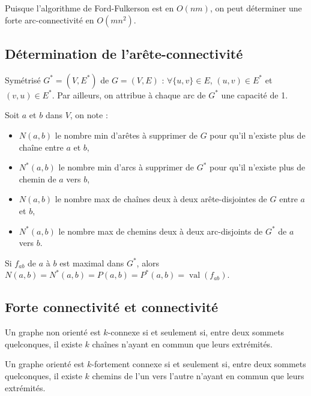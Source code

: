 \documentclass[a4paper,10pt,twocolumn]{article}
\DeclareMathOperator{\val}{val}
\begin{document}
		Puisque l'algorithme de Ford-Fulkerson est en $O(nm)$, on peut déterminer une forte arc-connectivité en $O(mn^2)$.

	\subsection{Détermination de l'arête-connectivité}

		\begin{note}
		Symétrisé $G^* = (V,E^*)$ de $G = (V,E)$ : $\forall \{ u,v \} \in E$, $(u,v) \in E^*$ et $(v,u) \in E^*$.
		Par ailleurs, on attribue à chaque arc de $G^*$ une capacité de 1.
		\end{note}

		\begin{note}
		Soit $a$ et $b$ dans $V$, on note :
			\begin{itemize}
			\item $N(a,b)$ le nombre min d’arêtes à supprimer de $G$ pour qu’il n’existe plus de chaîne entre $a$ et $b$,
			\item $N^*(a,b)$ le nombre min d’arcs à supprimer de $G^*$ pour qu’il n’existe plus de chemin de $a$ vers $b$,
			\item $N(a,b)$ le nombre max de chaînes deux à deux arête-disjointes de $G$ entre $a$ et $b$,
			\item $N^*(a,b)$ le nombre max de chemins deux à deux arc-disjoints de $G^*$ de $a$ vers $b$.
			\end{itemize}
		\end{note}

		\begin{thm}
		Si $f_{ab}$ de $a$ à $b$ est maximal dans $G^*$, alors $N(a,b) = N^*(a,b) = P(a,b) = P^*(a,b) = \val(f_{ab})$.
		\end{thm}

	\subsection{Forte connectivité et connectivité}

		\begin{thm}[Menger]
		Un graphe non orienté est $k$-connexe si et seulement si, entre deux sommets quelconques, il existe $k$ chaînes n’ayant en commun que leurs extrémités.
		\end{thm}

		\begin{thm}[Menger]
		Un graphe orienté est $k$-fortement connexe si et seulement si, entre deux sommets quelconques, il existe $k$ chemins de l'un vers l'autre n’ayant en commun que leurs extrémités.
		\end{thm}
\end{document}
